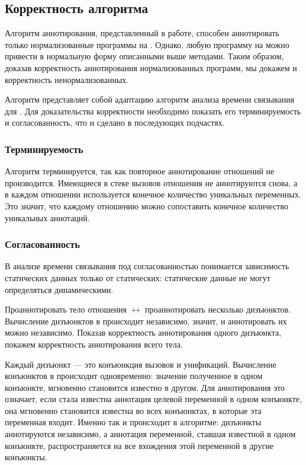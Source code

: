 \subsection{Корректность алгоритма}

Алгоритм аннотирования, представленный в работе, способен аннотировать только нормализованные программы на \miniKanren{}.
Однако, любую программу на \miniKanren{} можно привести в нормальную форму описанными выше методами.
Таким образом, доказав корректность аннотирования нормализованных программ, мы докажем и корректность ненормализованных.

Алгоритм представляет собой адаптацию алгоритм анализа времени связывания для \miniKanren{}.
Для доказательства корректности необходимо показать его терминируемость и согласованность, что и сделано в последующих подчастях.


\subsubsection{Терминируемость}

Алгоритм терминируется, так как повторное аннотирование отношений не производится.
Имеющиеся в стеке вызовов отношения не аннотируются снова, а в каждом отношении используется конечное количество уникальных переменных. 
Это значит, что каждому отношению можно сопоставить конечное количество уникальных аннотаций.


\subsubsection{Согласованность}

В анализе времени связывания под согласованностью понимается зависимость статических данных только от статических: статические данные не могут определяться динамическими.

Проаннотировать тело отношения $\leftrightarrow$ проаннотировать несколько дизъюнктов.
Вычисление дизъюнктов в \miniKanren{} происходит независимо, значит, и аннотировать их можно независимо.
Показав корректность аннотирования одного дизъюнкта, покажем корректность аннотирования всего тела.

Каждый дизъюнкт --- это конъюнкция вызовов и унификаций.
Вычисление конъюнктов в \miniKanren{} происходит одновременно: значение полученное в одном конъюнкте, мгновенно становится известно в другом.
Для аннотирования это означает, если стала известна аннотация целевой переменной в одном конъюнкте, она мгновенно становится известна во всех конъюнктах, в которые эта переменная входит.
Именно так и происходит в алгоритме: дизъюнкты аннотируются независимо, а аннотация переменной, ставшая известной в одном конъюнкте, распространяется на все вхождения этой переменной в другие конъюнкты.

